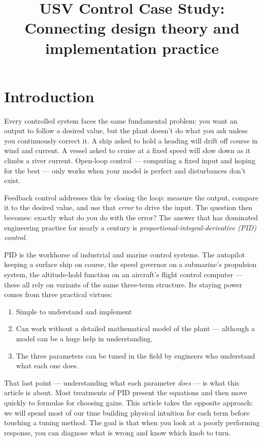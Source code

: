 \documentclass[12pt]{article}
\title{USV Control Case Study: \\ Connecting design theory and implementation practice}
\author{}
\date{}
\begin{document}
\maketitle
\tableofcontents
\newpage

\section{Introduction}
\label{sec:intro}

Every controlled system faces the same fundamental problem: you want an output
to follow a desired value, but the plant doesn't do what you ask unless you
continuously correct it.  A ship asked to hold a heading will drift off course
in wind and current.  A vessel asked to cruise at a fixed speed will slow down
as it climbs a river current.  Open-loop control --- computing a fixed input
and hoping for the best --- only works when your model is perfect and
disturbances don't exist.

Feedback control addresses this by closing the loop: measure the output,
compare it to the desired value, and use that \emph{error} to drive the input.
The question then becomes: exactly what do you do with the error?  The answer
that has dominated engineering practice for nearly a century is
\emph{proportional-integral-derivative (PID) control}.

PID is the workhorse of industrial and marine control systems.  The autopilot
keeping a surface ship on course, the speed governor on a submarine's propulsion
system, the altitude-hold function on an aircraft's flight control computer ---
these all rely on variants of the same three-term structure.  Its staying power
comes from three practical virtues:
\begin{enumerate}
\item Simple to understand and implement
\item Can work without a detailed mathematical model of the plant --- although a
  model can be a huge help in understanding.
\item The three parameters can be tuned in the field by engineers who
  understand what each one does.
\end{enumerate}

That last point --- understanding what each parameter \emph{does} --- is what
this article is about.  Most treatments of PID present the equations and then
move quickly to formulas for choosing gains.  This article takes the opposite
approach: we will spend most of our time building physical intuition for each
term before touching a tuning method.  The goal is that when you look at a
poorly performing response, you can diagnose what is wrong and know which
knob to turn.
\end{document}
